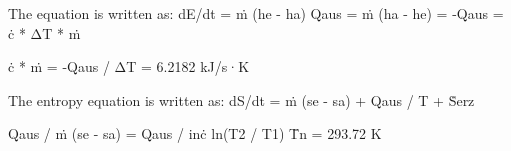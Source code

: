The equation is written as:  
dE/dt = ṁ (he - ha)  
Qaus = ṁ (ha - he) = -Qaus = ċ * ΔT * ṁ  

ċ * ṁ = -Qaus / ΔT = 6.2182 kJ/s·K  

The entropy equation is written as:  
dS/dt = ṁ (se - sa) + Qaus / T + Ṡerz  

Qaus / ṁ (se - sa) = Qaus / inċ ln(T2 / T1)  
T̄n = 293.72 K